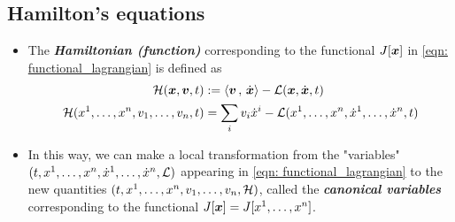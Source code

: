\documentclass[11pt]{article}
\begin{document}
\subsection{Hamilton's equations}
\begin{itemize}
\item 
\begin{definition}
The \emph{\textbf{Hamiltonian (function)}} corresponding to the functional $J[\boldsymbol{x}]$ in \eqref{eqn: functional_lagrangian} is defined as 
\begin{align}
{\mathcal H}( \boldsymbol{x}, \boldsymbol{v}, t) &:= \left\langle \boldsymbol{v}\,,\, \dot{\boldsymbol{x}} \right\rangle - {\mathcal L}(\boldsymbol{x}, \dot{\boldsymbol{x}}, t) \nonumber\\
{\mathcal H}(x^1, \ldots, x^n, v_{1}, \ldots,  v_{n}, t) &= \sum_{i}v_i \dot{x}^{i} -  {\mathcal L}(x^1, \ldots, x^n, \dot{x}^{1}, \ldots,  \dot{x}^{n}, t) \label{eqn: Hamiltonian}
\end{align}
\end{definition}

\item  In this way, we can make a local transformation from the "variables"  $(t, x^1, \ldots, x^n, \dot{x}^{1}, \ldots,  \dot{x}^{n}, {\mathcal L})$ appearing in \eqref{eqn: functional_lagrangian} to the new quantities  $(t, x^1, \ldots, x^n, v_{1}, \ldots,  v_{n}, {\mathcal H})$, called the \emph{\textbf{canonical variables}} corresponding to the functional $J[\boldsymbol{x}] = J[x^1, \ldots, x^n]$.


\end{itemize}
\end{document}
